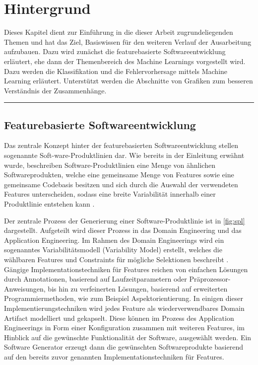 
\chapter{Hintergrund}
\label{background}

Dieses Kapitel dient zur Einführung in die dieser Arbeit zugrundeliegenden Themen und hat das Ziel, Basiswissen für den weiteren Verlauf der Ausarbeitung aufzubauen. Dazu wird zunächst die featurebasierte Softwareentwicklung erläutert, ehe dann der Themenbereich des Machine Learnings vorgestellt wird. Dazu werden die Klassifikation und die Fehlervorhersage mittels Machine Learning erläutert. Unterstützt werden die Abschnitte von Grafiken zum besseren Verständnis der Zusammenhänge.
\\
\hrule

\section{Featurebasierte Softwareentwicklung}
\label{feat-develop}

Das zentrale Konzept hinter der featurebasierten Softwareentwicklung stellen sogenannte Soft-ware-Produktlinien dar. Wie bereits in der Einleitung erwähnt wurde, beschreiben Software-Produktlinien eine Menge von ähnlichen Softwareprodukten, welche eine gemeinsame Menge von Features sowie eine gemeinsame Codebasis besitzen und sich durch die Auswahl der verwendeten Features unterscheiden, sodass eine breite Variabilität innerhalb einer Produktlinie entstehen kann \cite{Apel2013,Thuem2014}.

Der zentrale Prozess der Generierung einer Software-Produktlinie ist in \autoref{fig:spl} dargestellt. Aufgeteilt wird dieser Prozess in das Domain Engineering und das Application Engineering. Im Rahmen des Domain Engineerings wird ein sogenanntes Variabilitätsmodell (Variability Model) erstellt, welches die wählbaren Features und Constraints für mögliche Selektionen beschreibt \cite{Apel2013}. Gängige Implementationstechniken für Features reichen von einfachen Lösungen durch Annotationen, basierend auf Laufzeitparametern oder Präprozessor-Anweisungen, bis hin zu verfeinerten Lösungen, basierend auf erweiterten Programmiermethoden, wie zum Beispiel Aspektorientierung. In einigen dieser Implementierungstechniken wird jedes Feature als wiederverwendbares Domain Artifact modelliert und gekapselt. Diese können im Prozess des Application Engineerings in Form einer Konfiguration zusammen mit weiteren Features, im Hinblick auf die gewünschte Funktionalität der Software, ausgewählt werden. Ein Software Generator erzeugt dann die gewünschten Softwareprodukte basierend auf den bereits zuvor genannten Implementationstechniken für Features.

